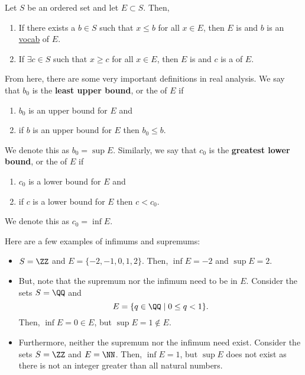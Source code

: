 \begin{definition}
Let $S$ be an ordered set and let $E\subset S$. Then,
\begin{enumerate}
    \item If there exists a $b\in S$ such that $x\leq b$ for all $x\in E$, then $E$ is  and $b$ is an \underline{vocab} of $E$. 
    \item If $\exists c\in S$ such that $x\geq c$ for all $x\in E$, then $E$ is  and $c$ is a  of $E$. 
\end{enumerate}
\end{definition}

From here, there are some very important definitions in real analysis. We say that $b_0$ is the \textbf{least upper bound}, or the  of $E$ if 
    \begin{enumerate}[label=\Alph*)]
        \item $b_0$ is an upper bound for $E$ and 
        \item if $b$ is an upper bound for $E$ then $b_0 \leq b.$
    \end{enumerate}
We denote this as $b_0 = \sup E$. Similarly, we say that $c_0$ is the \textbf{greatest lower bound}, or the  of $E$ if 
    \begin{enumerate}[label=\Alph*)]
        \item $c_0$ is a lower bound for $E$ and 
        \item if $c$ is a lower bound for $E$ then $c<c_0.$
    \end{enumerate}
We denote this as $c_0 = \inf E$. 

\begin{example}
Here are a few examples of infimums and supremums:
\begin{itemize}
    \item $S=\ZZ$ and $E = \{-2,-1,0,1,2\}$. Then, $\inf E = -2$ and $\sup E = 2$.
    \item But, note that the supremum nor the infimum need to be in $E$. Consider the sets $S = \QQ$ and \[E =\{q\in \QQ \mid 0\leq q<1\}.\] Then, $\inf E = 0\in E$, but $\sup E = 1 \notin E$. 
    \item Furthermore, neither the supremum nor the infimum need exist. Consider the sets $S = \ZZ$ and $E = \NN$. Then, $\inf E = 1$, but $\sup E$ does not exist as there is not an integer greater than all natural numbers.
\end{itemize}
\end{example}

